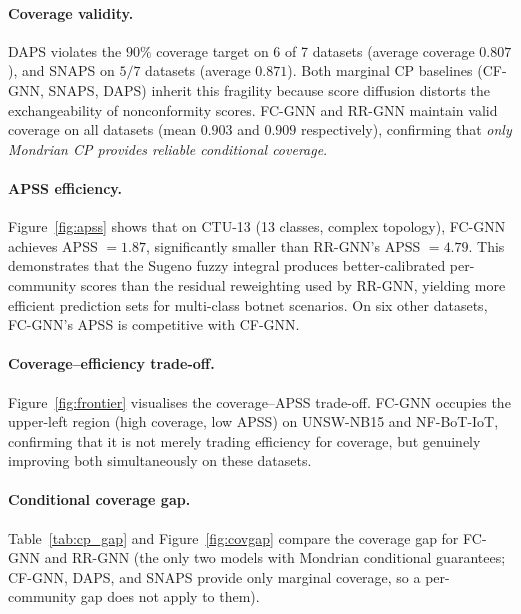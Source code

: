 \paragraph{Coverage validity.}
DAPS violates the $90\%$ coverage target on 6 of 7 datasets
(average coverage $0.807$), and SNAPS on $5/7$ datasets (average $0.871$).
Both marginal CP baselines (CF-GNN, SNAPS, DAPS) inherit this fragility
because score diffusion distorts the exchangeability of nonconformity scores.
FC-GNN and RR-GNN maintain valid coverage on all datasets (mean $0.903$ and
$0.909$ respectively), confirming that \emph{only Mondrian CP provides
reliable conditional coverage}.

\paragraph{APSS efficiency.}
Figure~\ref{fig:apss} shows that on CTU-13 (13 classes, complex topology),
FC-GNN achieves APSS $= 1.87$, significantly smaller than RR-GNN's
APSS $= 4.79$.
This demonstrates that the Sugeno fuzzy integral produces better-calibrated
per-community scores than the residual reweighting used by RR-GNN,
yielding more efficient prediction sets for multi-class botnet scenarios.
On six other datasets, FC-GNN's APSS is competitive with CF-GNN.

\paragraph{Coverage–efficiency trade-off.}
Figure~\ref{fig:frontier} visualises the coverage–APSS trade-off.
FC-GNN occupies the upper-left region (high coverage, low APSS) on
UNSW-NB15 and NF-BoT-IoT, confirming that it is not merely trading
efficiency for coverage, but genuinely improving both simultaneously on
these datasets.

\paragraph{Conditional coverage gap.}
Table~\ref{tab:cp_gap} and Figure~\ref{fig:covgap} compare the coverage gap
for FC-GNN and RR-GNN (the only two models with Mondrian conditional
guarantees; CF-GNN, DAPS, and SNAPS provide only marginal coverage, so a
per-community gap does not apply to them).

